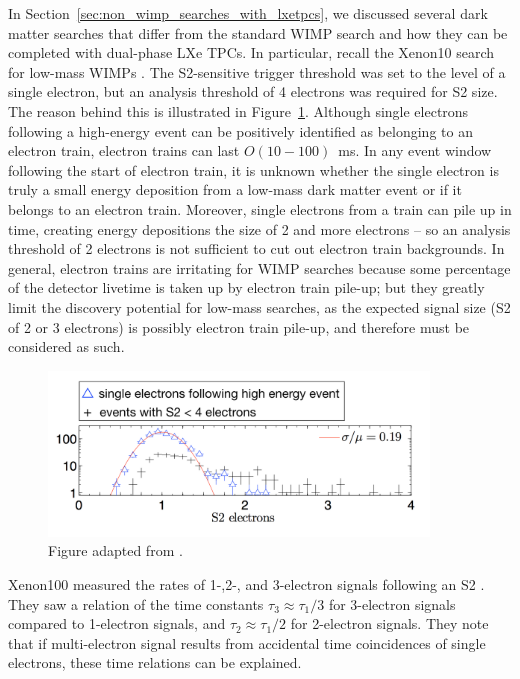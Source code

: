 In Section~\ref{sec:non_wimp_searches_with_lxetpcs}, we discussed several dark matter searches that differ from the standard \ac{WIMP} search and how they can be completed with dual-phase \ac{LXe} \ac{TPC}s. In particular, recall the Xenon10 search for low-mass \ac{WIMP}s \cite{Angle2011}. The S2-sensitive trigger threshold was set to the level of a single electron, but an analysis threshold of 4 electrons was required for S2 size. The reason behind this is illustrated in Figure~\ref{fig:xenon10_s2s}. Although single electrons following a high-energy event can be positively identified as belonging to an electron train, electron trains can last $O(10-100)$~ms. In any event window following the start of electron train, it is unknown whether the single electron is truly a small energy deposition from a low-mass dark matter event or if it belongs to an electron train. Moreover, single electrons from a train can pile up in time, creating energy depositions the size of 2 and more electrons -- so an analysis threshold of 2 electrons is not sufficient to cut out electron train backgrounds. In general, electron trains are irritating for \ac{WIMP} searches because some percentage of the detector livetime is taken up by electron train pile-up; but they greatly limit the discovery potential for low-mass searches, as the expected signal size (S2 of 2 or 3 electrons) is possibly electron train pile-up, and therefore must be considered as such.

\begin{figure}[htbp]
\begin{center}
\includegraphics[width=0.9\textwidth]{figures/etrains/xenon10_s2s.png}
\caption{Figure adapted from \cite{Angle2011}.}
\label{fig:xenon10_s2s}
\end{center}
\end{figure}

Xenon100 measured the rates of 1-,2-, and 3-electron signals following an S2 \cite{Aprile2014}. They saw a relation of the time constants $\tau_{3} \approx \tau_{1}/3$ for 3-electron signals compared to 1-electron signals, and $\tau_{2} \approx \tau_{1}/2$ for 2-electron signals. They note that if multi-electron signal results from accidental time coincidences of single electrons, these time relations can be explained. 


